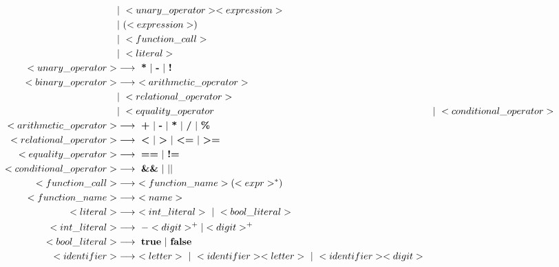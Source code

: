 \documentclass{article}
\begin{document}
\begin{align*}
    &| \ <unary\_operator> <expression> \\
    &| \ ( <expression> ) \\
    &| \ <function\_call> \\
    &| \ <literal> \\
<unary\_operator> &\longrightarrow \ \textbf{*} \ | \ \textbf{-} \ | \ \textbf{!} \\
<binary\_operator> &\longrightarrow \ <arithmetic\_operator> \\ 
    &| \ <relational\_operator> \\
    &| \ <equality\_operator
    &| \ <conditional\_operator> \\
<arithmetic\_operator> &\longrightarrow \ \textbf{+} \
    | \ \textbf{-} \
    | \ \textbf{*} \
    | \ \textbf{/} \
    | \ \textbf{\%} \\
<relational\_operator> &\longrightarrow \ \textbf{\textless} \
    | \ \textbf{\textgreater} \
    | \ \textbf{\textless=} \
    | \ \textbf{\textgreater=} \\
<equality\_operator> &\longrightarrow \ \textbf{==} \ | \ \textbf{!=} \\
<conditional\_operator> &\longrightarrow \ \textbf{\&\&} \ | \ \textbf{$\mid\mid$} \\
<function\_call> &\longrightarrow \ <function\_name> ( <expr>^* ) \\
<function\_name> &\longrightarrow \ <name> \\
<literal> &\longrightarrow \ <int\_literal> \ | \ <bool\_literal> \\
<int\_literal> &\longrightarrow \ - <digit>^+|<digit>^+ \\
<bool\_literal> &\longrightarrow \ \textbf{true} \ | \ \textbf{false} \\
<identifier> &\longrightarrow \ <letter> \ | \ <identifier> <letter> \ | \ <identifier><digit> \\
\end{align*}
\end{document}
